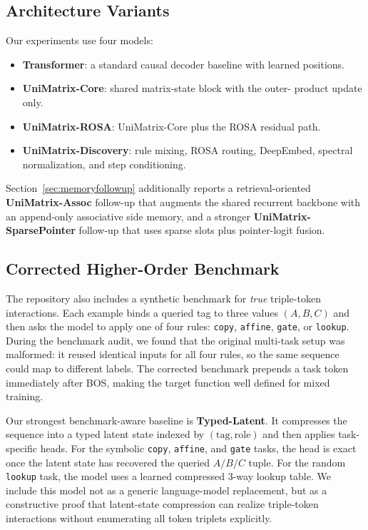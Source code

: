 \documentclass[11pt]{article}
\begin{document}
\subsection{Architecture Variants}
Our experiments use four models:
\begin{itemize}[leftmargin=1.25em]
  \item \textbf{Transformer}: a standard causal decoder baseline with learned
  positions.
  \item \textbf{UniMatrix-Core}: shared matrix-state block with the outer-
  product update only.
  \item \textbf{UniMatrix-ROSA}: UniMatrix-Core plus the ROSA residual path.
  \item \textbf{UniMatrix-Discovery}: rule mixing, ROSA routing, DeepEmbed,
  spectral normalization, and step conditioning.
\end{itemize}
Section~\ref{sec:memoryfollowup} additionally reports a retrieval-oriented
\textbf{UniMatrix-Assoc} follow-up that augments the shared recurrent backbone
with an append-only associative side memory, and a stronger
\textbf{UniMatrix-SparsePointer} follow-up that uses sparse slots plus
pointer-logit fusion.

\subsection{Corrected Higher-Order Benchmark}
The repository also includes a synthetic benchmark for \emph{true}
triple-token interactions. Each example binds a queried tag to three values
$(A, B, C)$ and then asks the model to apply one of four rules:
\texttt{copy}, \texttt{affine}, \texttt{gate}, or \texttt{lookup}. During the
benchmark audit, we found that the original multi-task setup was malformed: it
reused identical inputs for all four rules, so the same sequence could map to
different labels. The corrected benchmark prepends a task token immediately
after BOS, making the target function well defined for mixed training.

Our strongest benchmark-aware baseline is \textbf{Typed-Latent}. It compresses
the sequence into a typed latent state indexed by \((\text{tag}, \text{role})\)
and then applies task-specific heads. For the symbolic \texttt{copy},
\texttt{affine}, and \texttt{gate} tasks, the head is exact once the latent
state has recovered the queried \(A/B/C\) tuple. For the random
\texttt{lookup} task, the model uses a learned compressed 3-way lookup table.
We include this model not as a generic language-model replacement, but as a
constructive proof that latent-state compression can realize triple-token
interactions without enumerating all token triplets explicitly.
\end{document}
